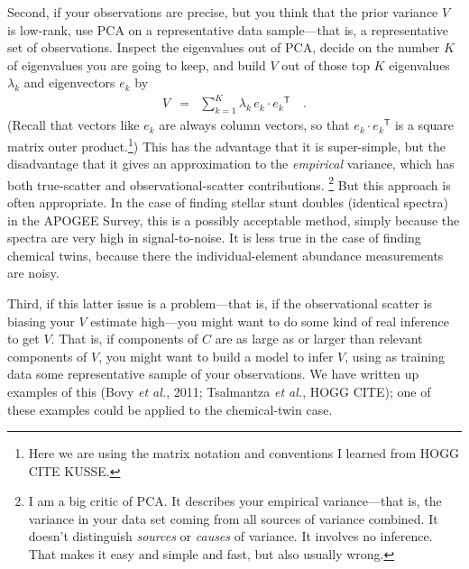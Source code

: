 \documentclass[12pt,letterpaper]{article}
\newcommand{\foreign}[1]{\textsl{#1}}
\newcommand{\acronym}[1]{{\small{#1}}}
\newcommand{\etal}{\foreign{et al.}}
\newcommand{\tra}[1]{{#1}^{\mathsf{T}}}
\begin{document}
Second, if your observations are precise, but you think that the prior
variance $V$ is low-rank, use \acronym{PCA} on a representative data
sample---that is, a representative set of observations. Inspect the
eigenvalues out of \acronym{PCA}, decide on the number $K$ of eigenvalues
you are going to keep, and build
$V$ out of those top $K$ eigenvalues $\lambda_k$ and eigenvectors $e_k$ by
\begin{eqnarray}
  V &=& \sum_{k=1}^K \lambda_k\,e_k\cdot\tra{e_k}
\quad .
\end{eqnarray}
(Recall that vectors like $e_k$ are always column vectors, so that $e_k\cdot\tra{e_k}$
is a square matrix outer product.\footnote{Here we are using the matrix notation and
  conventions I learned from HOGG CITE KUSSE.})
This has the advantage that it is super-simple, but the
disadvantage that it gives an approximation to the
\emph{empirical} variance, which has both true-scatter and
observational-scatter contributions.%
\footnote{I am a big critic of \acronym{PCA}. It describes your
  empirical variance---that is, the variance in your data set coming
  from all sources of variance combined. It doesn't distinguish
  \emph{sources} or \emph{causes} of variance. It involves no
  inference. That makes it easy and simple and fast, but also usually
  wrong.}
But this approach is often
appropriate. In the case of finding stellar stunt doubles (identical
spectra) in the \acronym{APOGEE} Survey, this is a possibly acceptable
method, simply because the spectra are very high in
signal-to-noise. It is less true in the case of finding chemical
twins, because there the individual-element abundance measurements are
noisy.

Third, if this latter issue is a problem---that is, if the
observational scatter is biasing your $V$ estimate high---you might
want to do some kind of real inference to get $V$. That is, if
components of $C$ are as large as or larger than relevant components
of $V$, you might want to build a model to infer $V$, using as
training data some representative sample of your observations. We have
written up examples of this (Bovy \etal, 2011; Tsalmantza \etal, HOGG CITE);
one of these examples could be applied to the chemical-twin case.
\end{document}
